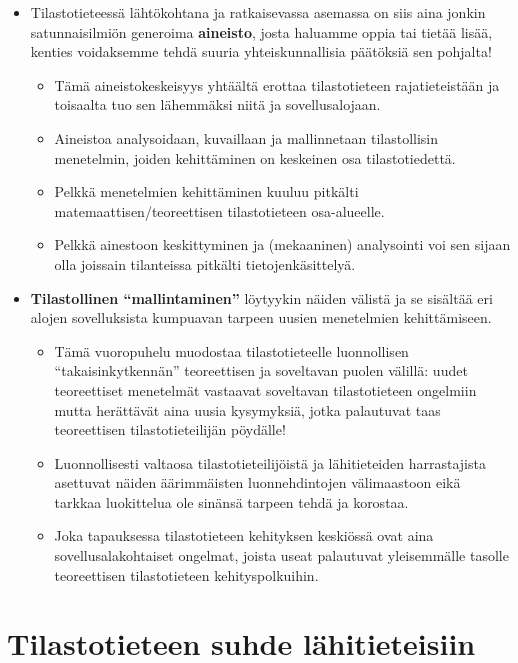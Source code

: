 \documentclass[
]{book}
\providecommand{\tightlist}{%
  \setlength{\itemsep}{0pt}\setlength{\parskip}{0pt}}
\begin{document}
\begin{itemize}
\tightlist
\item
  Tilastotieteessä lähtökohtana ja ratkaisevassa asemassa on siis aina jonkin satunnaisilmiön generoima \textbf{aineisto}, josta haluamme oppia tai tietää lisää, kenties voidaksemme tehdä suuria yhteiskunnallisia päätöksiä sen pohjalta!

  \begin{itemize}
  \tightlist
  \item
    Tämä aineistokeskeisyys yhtäältä erottaa tilastotieteen rajatieteistään ja toisaalta tuo sen lähemmäksi niitä ja sovellusalojaan.
  \item
    Aineistoa analysoidaan, kuvaillaan ja mallinnetaan tilastollisin menetelmin, joiden kehittäminen on keskeinen osa tilastotiedettä.
  \item
    Pelkkä menetelmien kehittäminen kuuluu pitkälti matemaattisen/teoreettisen tilastotieteen osa-alueelle.
  \item
    Pelkkä ainestoon keskittyminen ja (mekaaninen) analysointi voi sen sijaan olla joissain tilanteissa pitkälti tietojenkäsittelyä.
  \end{itemize}
\item
  \textbf{Tilastollinen ``mallintaminen''} löytyykin näiden välistä ja se sisältää eri alojen sovelluksista kumpuavan tarpeen uusien menetelmien kehittämiseen.

  \begin{itemize}
  \tightlist
  \item
    Tämä vuoropuhelu muodostaa tilastotieteelle luonnollisen ``takaisinkytkennän'' teoreettisen ja soveltavan puolen välillä: uudet teoreettiset menetelmät vastaavat soveltavan tilastotieteen ongelmiin mutta herättävät aina uusia kysymyksiä, jotka palautuvat taas teoreettisen tilastotieteilijän pöydälle!
  \item
    Luonnollisesti valtaosa tilastotieteilijöistä ja lähitieteiden harrastajista asettuvat näiden äärimmäisten luonnehdintojen välimaastoon eikä tarkkaa luokittelua ole sinänsä tarpeen tehdä ja korostaa.
  \item
    Joka tapauksessa tilastotieteen kehityksen keskiössä ovat aina sovellusalakohtaiset ongelmat, joista useat palautuvat yleisemmälle tasolle teoreettisen tilastotieteen kehityspolkuihin.
  \end{itemize}
\end{itemize}

\hypertarget{alaluku33}{%
\section{Tilastotieteen suhde lähitieteisiin}\label{alaluku33}}
\end{document}
